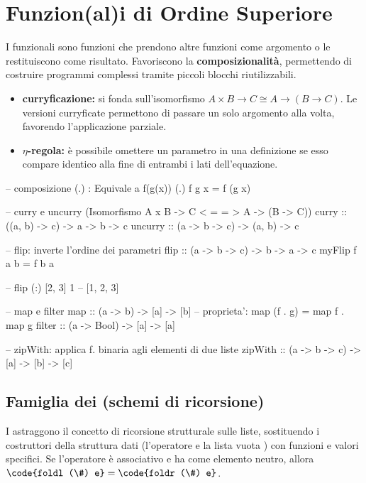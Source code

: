 \documentclass[a4paper,11pt]{report}
\begin{document}
\section{Funzion(al)i di Ordine Superiore}
I funzionali sono funzioni che prendono altre funzioni come argomento o le restituiscono come risultato. Favoriscono la \textbf{composizionalità}, permettendo di costruire programmi complessi tramite piccoli blocchi riutilizzabili.

\begin{itemize}
    \item \textbf{curryficazione:} si fonda sull'isomorfismo $A \times B \rightarrow C \cong A \rightarrow (B \rightarrow C)$. Le versioni curryficate permettono di passare un solo argomento alla volta, favorendo l'applicazione parziale.
    \item \textbf{$\eta$-regola:} è possibile omettere un parametro in una definizione se esso compare identico alla fine di entrambi i lati dell'equazione.
\end{itemize}

\begin{haskellbox}{}
-- composizione (.) : Equivale a f(g(x))
(.) f g x = f (g x)

-- curry e uncurry (Isomorfismo A x B -> C  < = = >  A -> (B -> C))
curry :: ((a, b) -> c) -> a -> b -> c
uncurry :: (a -> b -> c) -> (a, b) -> c

-- flip: inverte l'ordine dei parametri
flip :: (a -> b -> c) -> b -> a -> c
myFlip f a b = f b a

-- flip (:) [2, 3] 1
-- [1, 2, 3]

-- map e filter
map :: (a -> b) -> [a] -> [b]         -- proprieta': map (f . g) = map f . map g
filter :: (a -> Bool) -> [a] -> [a]

-- zipWith: applica f. binaria agli elementi di due liste
zipWith :: (a -> b -> c) -> [a] -> [b] -> [c]
\end{haskellbox}

\subsection{Famiglia dei  (schemi di ricorsione)}
I  astraggono il concetto di ricorsione strutturale sulle liste, sostituendo i costruttori della struttura dati (l'operatore \code{(:)} e la lista vuota \code{[]}) con funzioni e valori specifici. Se l'operatore \code{\#} è associativo e ha  come elemento neutro, allora $\code{foldl (\#) e} = \code{foldr (\#) e}$.
\end{document}
